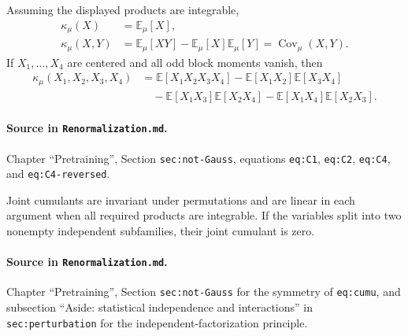 \begin{lemma}
\label{lem:renorm:lowCumulants}
Assuming the displayed products are integrable,
\begin{align*}
 \kappa_\mu(X)&=\mathbb E_\mu[X],\\
 \kappa_\mu(X,Y)&=\mathbb E_\mu[XY]-\mathbb E_\mu[X]\mathbb E_\mu[Y]
                  =\operatorname{Cov}_\mu(X,Y).
\end{align*}
If $X_1,\ldots,X_4$ are centered and all odd block moments vanish, then
\begin{align*}
 \kappa_\mu(X_1,X_2,X_3,X_4)
 &=\mathbb E[X_1X_2X_3X_4]
   -\mathbb E[X_1X_2]\mathbb E[X_3X_4]\\
 &\quad-\mathbb E[X_1X_3]\mathbb E[X_2X_4]
   -\mathbb E[X_1X_4]\mathbb E[X_2X_3].
\end{align*}

\paragraph{Source in \texttt{Renormalization.md}.}
Chapter ``Pretraining'', Section \texttt{sec:not-Gauss}, equations \texttt{eq:C1},
\texttt{eq:C2}, \texttt{eq:C4}, and \texttt{eq:C4-reversed}.
\end{lemma}

\begin{lemma}
\label{lem:renorm:cumulantStructural}
Joint cumulants are invariant under permutations and are linear in each argument when all required
products are integrable.  If the variables split into two nonempty independent subfamilies, their
joint cumulant is zero.

\paragraph{Source in \texttt{Renormalization.md}.}
Chapter ``Pretraining'', Section \texttt{sec:not-Gauss} for the symmetry of \texttt{eq:cumu}, and
subsection ``Aside: statistical independence and interactions'' in \texttt{sec:perturbation} for
the independent-factorization principle.
\end{lemma}

